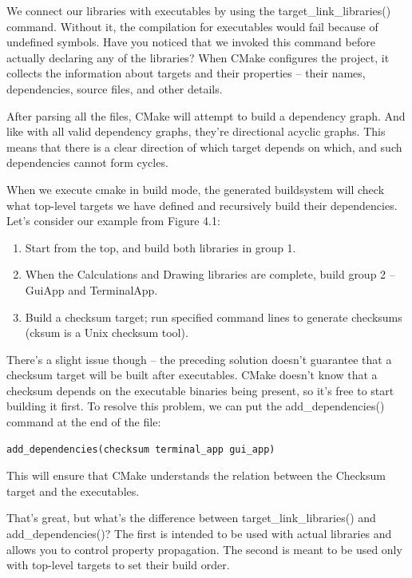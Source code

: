 We connect our libraries with executables by using the target\_link\_libraries() command. Without it, the compilation for executables would fail because of undefined symbols. Have you noticed that we invoked this command before actually declaring any of the libraries? When CMake configures the project, it collects the information about targets and their properties – their names, dependencies, source files, and other details.

After parsing all the files, CMake will attempt to build a dependency graph. And like with all valid dependency graphs, they're directional acyclic graphs. This means that there is a clear direction of which target depends on which, and such dependencies cannot form cycles.

When we execute cmake in build mode, the generated buildsystem will check what top-level targets we have defined and recursively build their dependencies. Let's consider our example from Figure 4.1:

\begin{enumerate}
\item 
Start from the top, and build both libraries in group 1.

\item 
When the Calculations and Drawing libraries are complete, build group 2 – GuiApp and TerminalApp.

\item 
Build a checksum target; run specified command lines to generate checksums (cksum is a Unix checksum tool).
\end{enumerate}

There's a slight issue though – the preceding solution doesn't guarantee that a checksum target will be built after executables. CMake doesn't know that a checksum depends on the executable binaries being present, so it's free to start building it first. To resolve this problem, we can put the add\_dependencies() command at the end of the file:

\begin{lstlisting}[style=styleCMake]
add_dependencies(checksum terminal_app gui_app)
\end{lstlisting}

This will ensure that CMake understands the relation between the Checksum target and the executables.

That's great, but what's the difference between target\_link\_libraries() and add\_dependencies()? The first is intended to be used with actual libraries and allows you to control property propagation. The second is meant to be used only with top-level targets to set their build order.

